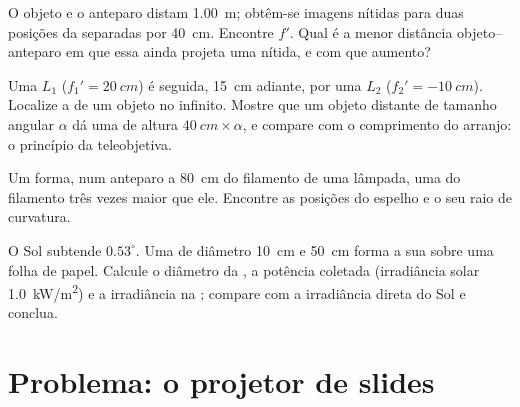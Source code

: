 \begin{exercise}[$\star\star$]\label{exo:b1:mirrors-thin-lenses:9}
O objeto e o anteparo distam \qty{1.00}{m}; obtêm-se imagens nítidas
para duas posições da  separadas por \qty{40}{cm}. Encontre $f'$. Qual é a
menor distância objeto--anteparo em que essa  ainda projeta uma
 nítida, e com que aumento?
\end{exercise}

\begin{exercise}[$\star\star\star$]\label{exo:b1:mirrors-thin-lenses:10}
Uma  $L_1$ ($f_1' = \qty{20}{cm}$) é seguida, \qty{15}{cm}
adiante, por uma  $L_2$ ($f_2' = \qty{-10}{cm}$). Localize a
 de um objeto no infinito. Mostre que um objeto distante de tamanho
angular $\alpha$ dá uma  de altura $\qty{40}{cm}\times\alpha$, e
compare com o comprimento do arranjo: o princípio da
teleobjetiva.
\end{exercise}

\begin{exercise}[$\star\star\star$]\label{exo:b1:mirrors-thin-lenses:11}
Um  forma, num anteparo a \qty{80}{cm} do filamento de uma lâmpada,
uma  do filamento três vezes maior que ele. Encontre as posições
do espelho e o seu raio de curvatura.
\end{exercise}

\begin{exercise}[$\star\star\star$]\label{exo:b1:mirrors-thin-lenses:12}
O Sol subtende $0.53^\circ$. Uma  de diâmetro
\qty{10}{cm} e  \qty{50}{cm} forma a sua  sobre uma folha de
papel. Calcule o diâmetro da , a potência coletada (irradiância
solar \qty{1.0}{kW/m^2}) e a irradiância na ; compare
com a irradiância direta do Sol e conclua.
\end{exercise}

\section{Problema: o projetor de slides}

